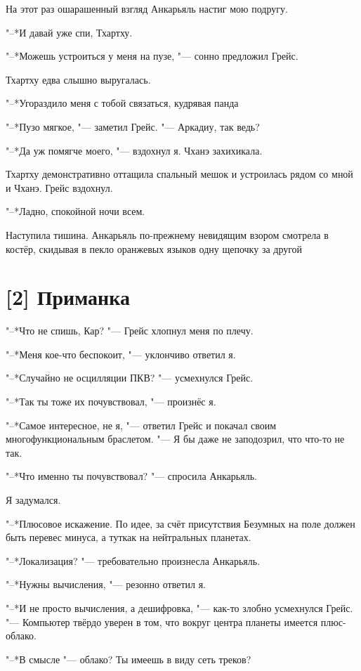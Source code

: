 На этот раз ошарашенный взгляд Анкарьяль настиг мою подругу.

"--*И давай уже спи, Тхартху.

"--*Можешь устроиться у меня на пузе, "--- сонно предложил Грейс.

Тхартху едва слышно выругалась.

"--*Угораздило меня с тобой связаться, кудрявая панда\ldotst

"--*Пузо мягкое, "--- заметил Грейс.
"--- Аркадиу, так ведь?

"--*Да уж помягче моего, "--- вздохнул я.
Чханэ захихикала.

Тхартху демонстративно оттащила спальный мешок и устроилась рядом со мной и Чханэ.
Грейс вздохнул.

"--*Ладно, спокойной ночи всем.

Наступила тишина.
Анкарьяль по-прежнему невидящим взором смотрела в костёр, скидывая в пекло оранжевых языков одну щепочку за другой\ldotst

\section{[2] Приманка}

"--*Что не спишь, Кар? "--- Грейс хлопнул меня по плечу.

"--*Меня кое-что беспокоит, "--- уклончиво ответил я.

"--*Случайно не осцилляции ПКВ? "--- усмехнулся Грейс.

"--*Так ты тоже их почувствовал, "--- произнёс я.

"--*Самое интересное, не я, "--- ответил Грейс и покачал своим многофункциональным браслетом.
"--- Я бы даже не заподозрил, что что-то не так.

"--*Что именно ты почувствовал? "--- спросила Анкарьяль.

Я задумался.

"--*Плюсовое искажение.
По идее, за счёт присутствия Безумных на поле должен быть перевес минуса, а тут\ldotst как на нейтральных планетах.

"--*Локализация? "--- требовательно произнесла Анкарьяль.

"--*Нужны вычисления, "--- резонно ответил я.

"--*И не просто вычисления, а дешифровка, "--- как-то злобно усмехнулся Грейс.
"--- Компьютер твёрдо уверен в том, что вокруг центра планеты имеется плюс-облако.

"--*В смысле "--- облако?
Ты имеешь в виду сеть треков?

